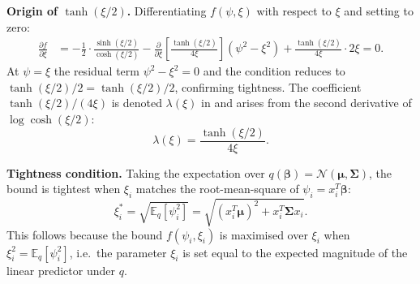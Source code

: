 \documentclass[11pt,a4paper]{article}
\newcommand{\E}{\mathbb{E}}
\begin{document}
\textbf{Origin of $\tanh(\xi/2)$.}
Differentiating $f(\psi, \xi)$ with respect to $\xi$ and setting to zero:
\begin{align*}
  \frac{\partial f}{\partial \xi}
  &= -\frac{1}{2}\cdot\frac{\sinh(\xi/2)}{\cosh(\xi/2)}
     - \frac{\partial}{\partial\xi}\!\left[\frac{\tanh(\xi/2)}{4\xi}\right](\psi^2-\xi^2)
     + \frac{\tanh(\xi/2)}{4\xi}\cdot 2\xi = 0.
\end{align*}
At $\psi = \xi$ the residual term $\psi^2 - \xi^2 = 0$ and the condition reduces to
$\tanh(\xi/2)/2 = \tanh(\xi/2)/2$, confirming tightness.
The coefficient $\tanh(\xi/2)/(4\xi)$ is denoted $\lambda(\xi)$ in \textcite{Jaakkola2000}
and arises from the second derivative of $\log\cosh(\xi/2)$:
\begin{equation*}
  \lambda(\xi) = \frac{\tanh(\xi/2)}{4\xi}.
\end{equation*}

\textbf{Tightness condition.}
Taking the expectation over $q(\bm{\beta}) = \mathcal{N}(\bm{\mu},\bm{\Sigma})$,
the bound is tightest when $\xi_i$ matches the root-mean-square of $\psi_i = x_i^T\bm{\beta}$:
\begin{equation*}
  \xi_i^* = \sqrt{\E_q[\psi_i^2]} = \sqrt{(x_i^T\bm{\mu})^2 + x_i^T\bm{\Sigma}x_i}.
\end{equation*}
This follows because the bound $f(\psi_i,\xi_i)$ is maximised over $\xi_i$ when
$\xi_i^2 = \E_q[\psi_i^2]$, i.e.\ the parameter $\xi_i$ is set equal to the
expected magnitude of the linear predictor under $q$.
\end{document}
